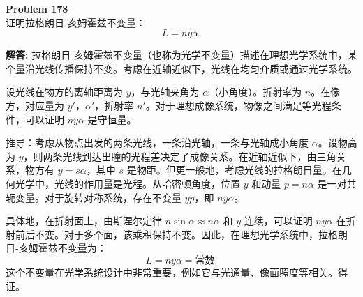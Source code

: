 \documentclass[12pt, a4paper, oneside]{ctexart}
\newenvironment{solution}{\par\noindent\textbf{解答:}\quad}{\par}
\begin{document}
\begin{mdframed}[backgroundcolor=gray!10, linewidth=0pt]
    \textbf{Problem 178} \\
    证明拉格朗日-亥姆霍兹不变量：
    \[
    L = n y \alpha.
    \]
\end{mdframed}
\begin{solution}
    拉格朗日-亥姆霍兹不变量（也称为光学不变量）描述在理想光学系统中，某个量沿光线传播保持不变。考虑在近轴近似下，光线在均匀介质或通过光学系统。

    设光线在物方的离轴距离为 $y$，与光轴夹角为 $\alpha$（小角度）。折射率为 $n$。在像方，对应量为 $y'$，$\alpha'$，折射率 $n'$。对于理想成像系统，物像之间满足等光程条件，可以证明 $n y \alpha$ 是守恒量。

    推导：考虑从物点出发的两条光线，一条沿光轴，一条与光轴成小角度 $\alpha$。设物高为 $y$，则两条光线到达出瞳的光程差决定了成像关系。在近轴近似下，由三角关系，物方有 $y = s \alpha$，其中 $s$ 是物距。但更一般地，考虑光线的拉格朗日量。在几何光学中，光线的作用量是光程。从哈密顿角度，位置 $y$ 和动量 $p = n \alpha$ 是一对共轭变量。对于旋转对称系统，存在不变量 $y p$，即 $n y \alpha$。

    具体地，在折射面上，由斯涅尔定律 $n \sin\alpha \approx n \alpha$ 和 $y$ 连续，可以证明 $n y \alpha$ 在折射前后不变。对于多个面，该乘积保持不变。因此，在理想光学系统中，拉格朗日-亥姆霍兹不变量为：
    \[
    L = n y \alpha = \text{常数}.
    \]
    这个不变量在光学系统设计中非常重要，例如它与光通量、像面照度等相关。得证。
\end{solution}
\end{document}
